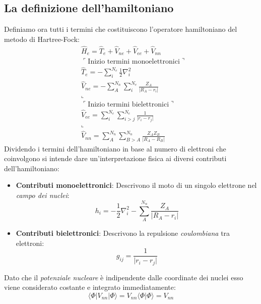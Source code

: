 \documentclass[oneside]{amsbook}
\numberwithin{section}{chapter}
\numberwithin{equation}{section}
\numberwithin{figure}{section}
\begin{document}
\subsection{La definizione dell'hamiltoniano}
Definiamo ora tutti i termini che costituiscono l'operatore hamiltoniano del metodo di Hartree-Fock:
\begin{equation}
\label{hamil}
\begin{aligned}
&\hat{H}_e=\hat{T}_e+\hat{V}_{ne}+\hat{V}_{ee}+\hat{V}_{nn} \\
&\ulcorner\text{Inizio termini monoelettronici} \urcorner\\
&\hat{T}_e=-\sum \limits_i ^{N_e} \frac{1}{2}\nabla^2_i \\
&\hat{V}_{ne}=-\sum \limits_A ^{N_n}\sum \limits_i ^{N_e} \frac{Z_A}{\vert R_A-r_i\vert}\\
&\llcorner \\
&\ulcorner\text{Inizio termini bielettronici} \urcorner\\
&\hat{V}_{ee}=\sum \limits_i ^{N_e}\sum \limits_{i>j} ^{N_e} \frac{1}{\vert r_i-r_j\vert}\\
&\llcorner\\
&\hat{V}_{nn}=\sum \limits_A ^{N_n}\sum \limits_{B>A} ^{N_n} \frac{Z_AZ_B}{\vert R_A-R_B\vert}
\end{aligned}
\end{equation}
Dividendo i termini dell'hamiltoniano in base al numero di elettroni che coinvolgono si intende dare un'interpretazione fisica ai diversi contributi dell'hamiltoniano:
\begin{itemize}
\item \textbf{Contributi monoelettronici}: Descrivono il moto di un singolo elettrone nel \emph{campo dei nuclei}:
\begin{equation}
h_i=-\frac{1}{2}\nabla^2_i-\sum \limits_A ^{N_n} \frac{Z_A}{\vert R_A-r_i\vert}
\end{equation}
\item \textbf{Contributi bielettronici}: Descrivono la repulsione \emph{coulombiana} tra elettroni:
\begin{equation}
g_{ij}=\frac{1}{\vert r_i-r_j\vert}
\end{equation}
\end{itemize}
Dato che il \emph{potenziale nucleare} è indipendente dalle coordinate dei nuclei esso viene considerato costante e integrato immediatamente:
\begin{equation}
\langle\Phi\vert V_{nn}\vert \Phi\rangle= V_{nn}\langle\Phi\vert\Phi\rangle = V_{nn}
\end{equation}
\end{document}
